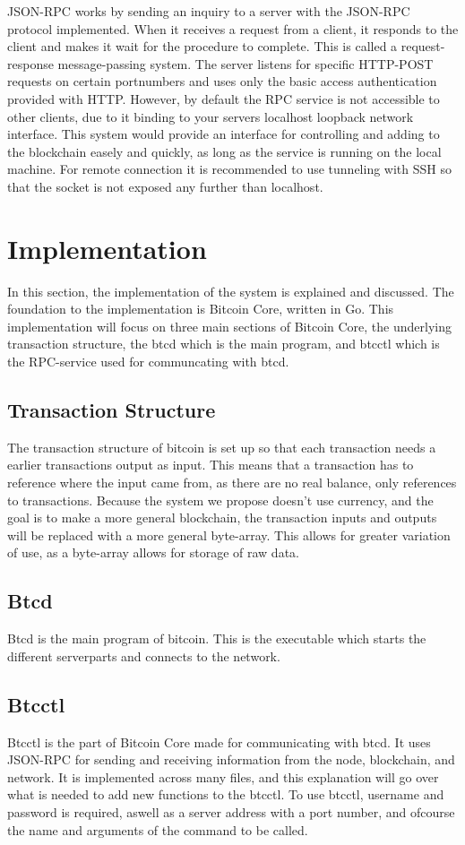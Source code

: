 \documentclass[11pt]{article}
\begin{document}
JSON-RPC works by sending an inquiry to a server with the JSON-RPC protocol implemented. When it receives a request from a client, it responds to the client and makes it wait for the procedure to complete. This is called a request-response message-passing system. The server listens for specific HTTP-POST requests on certain portnumbers and uses only the basic access authentication provided with HTTP. However, by default the RPC service is not accessible to other clients, due to it binding to your servers localhost loopback network interface. This system would provide an interface for controlling and adding to the blockchain easely and quickly, as long as the service is running on the local machine. For remote connection it is recommended to use tunneling with SSH so that the socket is not exposed any further than localhost. 

\section{Implementation}
In this section, the implementation of the system is explained and discussed. The foundation to the implementation is Bitcoin Core, written in Go. This implementation will focus on three main sections of Bitcoin Core, the underlying transaction structure, the btcd which is the main program, and btcctl which is the RPC-service used for communcating with btcd. 

\subsection{Transaction Structure}
The transaction structure of bitcoin is set up so that each transaction needs a earlier transactions output as input. This means that a transaction has to reference where the input came from, as there are no real balance, only references to transactions. Because the system we propose doesn't use currency, and the goal is to make a more general blockchain, the transaction inputs and outputs will be replaced with a more general byte-array. This allows for greater variation of use, as a byte-array allows for storage of raw data. 

\subsection{Btcd}
Btcd is the main program of bitcoin. This is the executable which starts the different serverparts and connects to the network. 

\subsection{Btcctl}
Btcctl is the part of Bitcoin Core made for communicating with btcd. It uses JSON-RPC for sending and receiving information from the node, blockchain, and network. It is implemented across many files, and this explanation will go over what is needed to add new functions to the btcctl. To use btcctl, username and password is required, aswell as a server address with a port number, and ofcourse the name and arguments of the command to be called. 
\end{document}
